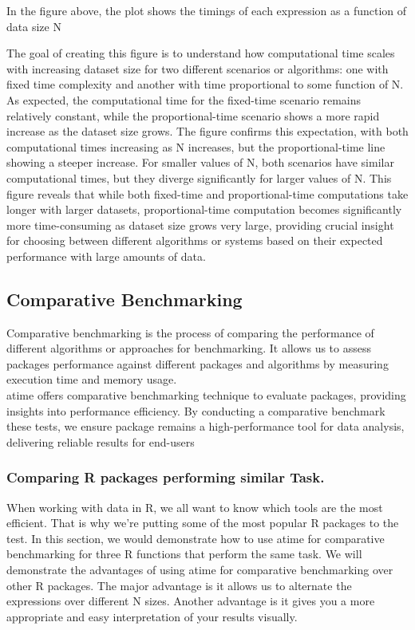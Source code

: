 \noindent In the figure above, the plot shows the timings of each expression as a function of data size N
\vspace{0.1in}


\noindent The goal of creating this figure is to understand how computational time scales with increasing dataset size for two different scenarios or algorithms: one with fixed time complexity and another with time proportional to some function of N. As expected, the computational time for the fixed-time scenario remains relatively constant, while the proportional-time scenario shows a more rapid increase as the dataset size grows. The figure confirms this expectation, with both computational times increasing as N increases, but the proportional-time line showing a steeper increase. For smaller values of N, both scenarios have similar computational times, but they diverge significantly for larger values of N. This figure reveals that while both fixed-time and proportional-time computations take longer with larger datasets, proportional-time computation becomes significantly more time-consuming as dataset size grows very large, providing crucial insight for choosing between different algorithms or systems based on their expected performance with large amounts of data.\\


\subsection{Comparative Benchmarking}

\noindent Comparative benchmarking is the process of comparing the performance of different algorithms or approaches for benchmarking. It allows us to assess packages performance against different packages and algorithms by measuring execution time and memory usage.\\

\noindent atime offers comparative benchmarking technique to evaluate packages, providing insights into performance efficiency. By conducting a comparative benchmark these tests, we ensure package remains a high-performance tool for data analysis, delivering reliable results for end-users\\

\subsubsection{Comparing R packages performing similar Task.}
\noindent When working with data in R, we all want to know which tools are the most efficient. That is why we're putting some of the most popular R packages to the test. 
In this section, we would demonstrate how to use atime for comparative benchmarking for three R functions that perform the same task. We will demonstrate the advantages of using atime for comparative benchmarking over other R packages. The major advantage is it allows us to alternate the expressions over different N sizes. Another advantage is it gives you a more appropriate and easy interpretation of your results visually.\\

